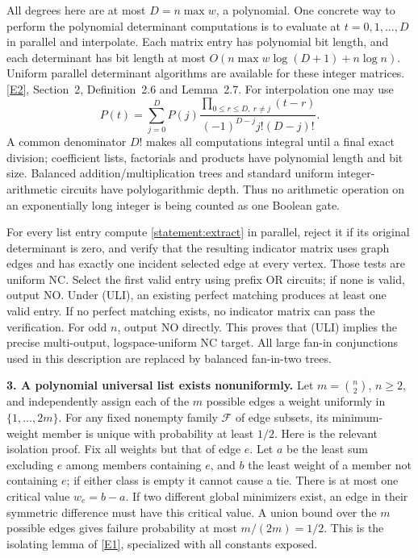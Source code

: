 \documentclass[11pt,a4paper]{article}
\newcommand{\eref}[2]{\hyperlink{extra:#1:#2}{[E#2]}}
\numberwithin{equation}{section}
\begin{document}
All degrees here are at most $D=n\max w$, a polynomial. One concrete
way to perform the polynomial determinant computations is to evaluate
at $t=0,1,\ldots,D$ in parallel and interpolate. Each matrix entry has
polynomial bit length, and each determinant has bit length at most
$O(n\max w\log(D+1)+n\log n)$. Uniform parallel determinant algorithms
are available for these integer matrices. \eref{statement}{2}, Section~2,
Definition~2.6 and Lemma~2.7. For interpolation one may use
\[
 P(t)=\sum_{j=0}^{D}P(j)
       \frac{\prod_{0\le r\le D,\ r\ne j}(t-r)}
            {(-1)^{D-j}j!(D-j)!}.
\]
A common denominator $D!$ makes all computations integral until a final
exact division; coefficient lists, factorials and products have
polynomial length and bit size. Balanced addition/multiplication trees
and standard uniform integer-arithmetic circuits have polylogarithmic
depth. Thus no arithmetic operation on an exponentially long integer is
being counted as one Boolean gate.

For every list entry compute \eqref{statement:extract} in parallel, reject it
if its original determinant is zero, and verify that the resulting
indicator matrix uses graph edges and has exactly one incident selected
edge at every vertex. Those tests are uniform NC. Select the first
valid entry using prefix OR circuits; if none is valid, output NO.
Under (ULI), an existing perfect matching produces at least one valid
entry. If no perfect matching exists, no indicator matrix can pass the
verification. For odd $n$, output NO directly. This proves that (ULI)
implies the precise multi-output, logspace-uniform NC target. All
large fan-in conjunctions used in this description are replaced by
balanced fan-in-two trees.

\textbf{3. A polynomial universal list exists nonuniformly.}
Let $m=\binom n2$, $n\ge2$, and independently assign each of the $m$
possible edges a weight uniformly in $\{1,\ldots,2m\}$.
For any fixed nonempty family $\mathcal F$ of edge subsets, its
minimum-weight member is unique with probability at least $1/2$.
Here is the relevant isolation proof. Fix all weights but that of edge
$e$. Let $a$ be the least sum excluding $e$ among members containing
$e$, and $b$ the least weight of a member not containing $e$; if either
class is empty it cannot cause a tie. There is at most one critical
value $w_e=b-a$. If two different global minimizers exist, an edge in
their symmetric difference must have this critical value. A union bound
over the $m$ possible edges gives failure probability at most
$m/(2m)=1/2$. This is the isolating lemma of \eref{statement}{1}, specialized
with all constants exposed.
\end{document}
